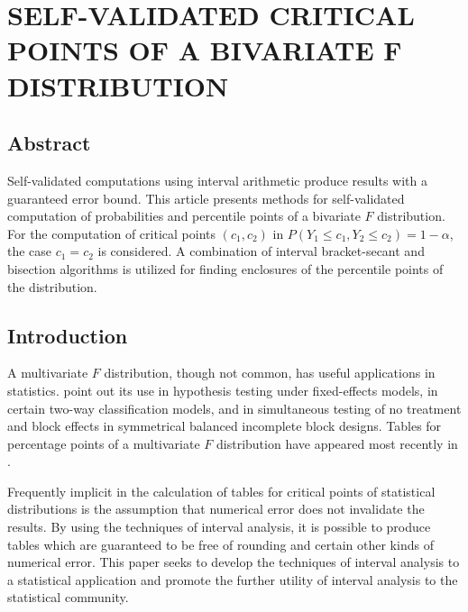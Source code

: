 
%
\chapter{SELF-VALIDATED CRITICAL POINTS OF A 
BIVARIATE F DISTRIBUTION}

\section*{Abstract}

Self-validated computations using interval arithmetic produce results with a
guaranteed error bound.  This article presents methods for self-validated
computation of probabilities and percentile points of a bivariate $F$
distribution.  For the computation of critical points
$(c_1, c_2)$ in $P(Y_1 \leq c_1, Y_2 \leq c_2) = 1-\alpha$, the case $c_1 =
c_2$ is considered.  A combination of interval bracket-secant and bisection
algorithms is utilized for finding enclosures of the percentile points of the
distribution.



\section{Introduction}

A multivariate $F$ distribution, though not common, has useful applications in
statistics. \cite{Krishnaiah75} point out its use in hypothesis testing under
fixed-effects models, in certain two-way classification models, and in
simultaneous testing of no treatment and block effects in symmetrical balanced
incomplete block designs.  Tables for percentage points of a multivariate $F$
distribution have appeared most recently in \cite{Krishnaiah80}.  

Frequently implicit in the calculation of tables for critical points of 
statistical distributions
is the assumption that numerical error does not invalidate the
results. 
By using the techniques of interval analysis, it is possible to
produce tables which are guaranteed to be free of rounding and certain other
kinds of numerical error.  This paper seeks to
develop the techniques of interval analysis to a statistical application and
promote the further utility of interval analysis to the statistical community.

